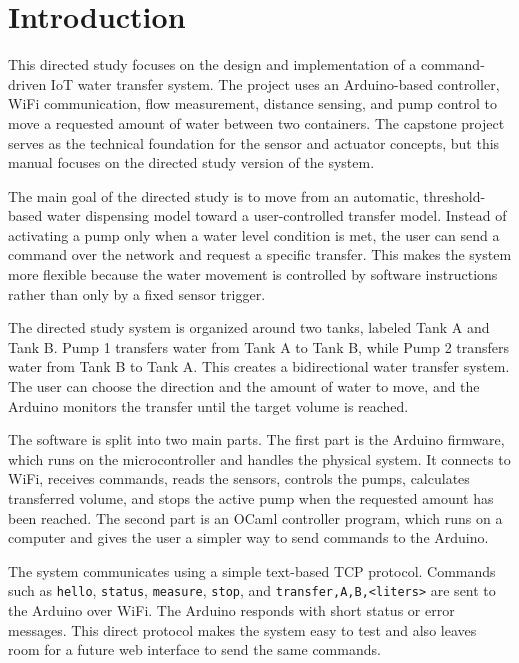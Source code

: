 
\chapter{Introduction}

This directed study focuses on the design and implementation of a command-driven IoT water transfer system. The project uses an Arduino-based controller, WiFi communication, flow measurement, distance sensing, and pump control to move a requested amount of water between two containers. The capstone project serves as the technical foundation for the sensor and actuator concepts, but this manual focuses on the directed study version of the system.

The main goal of the directed study is to move from an automatic, threshold-based water dispensing model toward a user-controlled transfer model. Instead of activating a pump only when a water level condition is met, the user can send a command over the network and request a specific transfer. This makes the system more flexible because the water movement is controlled by software instructions rather than only by a fixed sensor trigger.

The directed study system is organized around two tanks, labeled Tank A and Tank B. Pump 1 transfers water from Tank A to Tank B, while Pump 2 transfers water from Tank B to Tank A. This creates a bidirectional water transfer system. The user can choose the direction and the amount of water to move, and the Arduino monitors the transfer until the target volume is reached.

The software is split into two main parts. The first part is the Arduino firmware, which runs on the microcontroller and handles the physical system. It connects to WiFi, receives commands, reads the sensors, controls the pumps, calculates transferred volume, and stops the active pump when the requested amount has been reached. The second part is an OCaml controller program, which runs on a computer and gives the user a simpler way to send commands to the Arduino.

The system communicates using a simple text-based TCP protocol. Commands such as \texttt{hello}, \texttt{status}, \texttt{measure}, \texttt{stop}, and \texttt{transfer,A,B,<liters>} are sent to the Arduino over WiFi. The Arduino responds with short status or error messages. This direct protocol makes the system easy to test and also leaves room for a future web interface to send the same commands.

